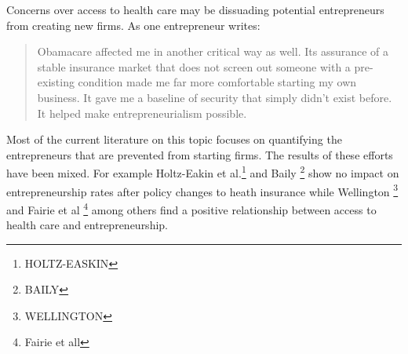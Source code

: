 \documentclass[12pt]{article}
\begin{document}
Concerns over access to health care may be dissuading potential entrepreneurs from creating new firms. As one entrepreneur writes:
\begin{quote}
Obamacare affected me in another critical way as well. Its assurance of a stable insurance market that does not screen out someone with a pre-existing condition made me far more comfortable starting my own business. It gave me a baseline of security that simply didn't exist before. It helped make entrepreneurialism possible. \cite{sullivan}
\end{quote}

Most of the current literature on this topic focuses on quantifying the entrepreneurs
that are prevented from starting firms. The results of these efforts have been mixed. For example Holtz-Eakin et al.\footnote{HOLTZ-EASKIN} and Baily \footnote{BAILY} show no impact on entrepreneurship rates after policy changes to heath insurance while Wellington \footnote{WELLINGTON} and Fairie et al \footnote{Fairie et all} among others find a positive relationship between access to health care and entrepreneurship. 

\begin{comment}

Research estimating of how many entrepreneurs are prevented from starting firms due to problems with the individual health insurance market have produced mixed results. Holtz-Eakin et al.\footnote{HOLTZ-EASKIN} and Baily \footnote{BAILY} show no impact on entrepreneurship rates after policy changes to heath insurance while Wellington \footnote{WELLINGTON} and Fairie et al \footnote{Fairie et all} among others find a positive relationship between access to health care and entrepreneurship.  

Holtz-Eakin et al.\footnote{HOLTZ-EASKIN}, Wellington \footnote{WELLINGTON} and Fairie et al \footnote{Fairie et all} consider entrepreneurs with health care through their spouses. Fairie et al \footnote{Fairie et all} study entrepreneurs near the traditional retirement age. Heim and Lurie show variation in health insurance's impact by age group and tax filing status. 

\end{comment}
\end{document}
